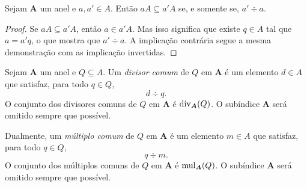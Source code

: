 \begin{prop}
Sejam $\bm A$ um anel e $a,a' \in A$. Então $aA \subseteq a'A$ se, e somente se, $a' \div a$.
\end{prop}
\begin{proof}
Se $aA \subseteq a'A$, então $a \in a'A$. Mas isso significa que existe $q \in A$ tal que $a=a'q$, o que mostra que $a' \div a$. A implicação contrária segue a mesma demonstração com as implicação invertidas.
\end{proof}

\begin{defi}
Sejam $\bm A$ um anel e $Q \subseteq A$. Um \emph{divisor comum} de $Q$ em $\bm A$ é um elemento $d \in A$ que satisfaz, para todo $q \in Q$,
	\begin{equation*}
	d \div q.
	\end{equation*}
O conjunto dos divisores comuns de $Q$ em $\bm A$ é $\operatorname{div}_{\bm A}(Q)$. O subíndice $\bm A$ será omitido sempre que possível.

Dualmente, um \emph{múltiplo comum} de $Q$ em $\bm A$ é um elemento $m \in A$ que satisfaz, para todo $q \in Q$,
	\begin{equation*}
	q \div m.
	\end{equation*}
O conjunto dos múltiplos comuns de $Q$ em $\bm A$ é $\operatorname{mul}_{\bm A}(Q)$. O subíndice $\bm A$ será omitido sempre que possível.
\end{defi}

